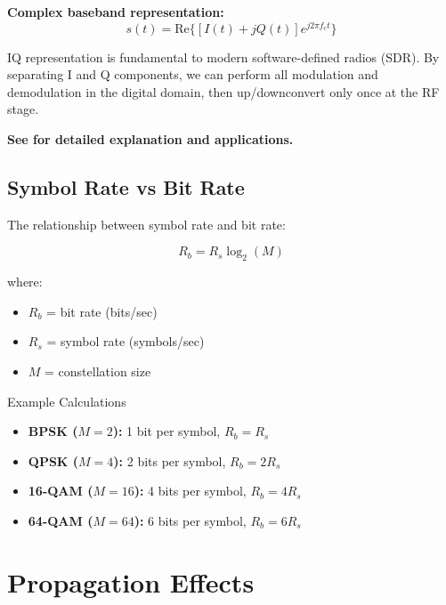 \textbf{Complex baseband representation:}
\begin{equation}
\label{eq:iq-complex}
s(t) = \text{Re}\{[I(t) + jQ(t)]e^{j2\pi f_c t}\}
\end{equation}

\begin{keyconcept}
IQ representation is fundamental to modern software-defined radios (SDR). By separating I and Q components, we can perform all modulation and demodulation in the digital domain, then up/downconvert only once at the RF stage.
\end{keyconcept}

\textbf{See  for detailed explanation and applications.}

\subsection{Symbol Rate vs Bit Rate}
\label{subsec:symbol-bit-rate}

The relationship between symbol rate and bit rate:

\begin{equation}
\label{eq:symbol-bit-rate}
R_b = R_s \log_2(M)
\end{equation}

where:
\begin{itemize}
\item $R_b$ = bit rate (bits/sec)
\item $R_s$ = symbol rate (symbols/sec)
\item $M$ = constellation size
\end{itemize}

\begin{calloutbox}{Example Calculations}
\begin{itemize}
\item \textbf{BPSK ($M=2$):} 1 bit per symbol, $R_b = R_s$
\item \textbf{QPSK ($M=4$):} 2 bits per symbol, $R_b = 2R_s$
\item \textbf{16-QAM ($M=16$):} 4 bits per symbol, $R_b = 4R_s$
\item \textbf{64-QAM ($M=64$):} 6 bits per symbol, $R_b = 6R_s$
\end{itemize}
\end{calloutbox}

\section{Propagation Effects}
\label{sec:propagation-effects}

